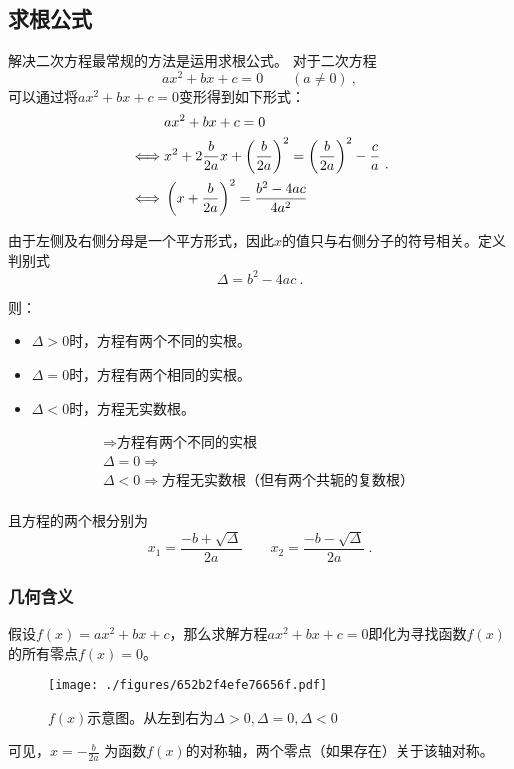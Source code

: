 
\subsection{求根公式}
解决二次方程最常规的方法是运用求根公式。
对于二次方程
$$ax^2+bx+c=0 \qquad (a\neq 0)~,$$
可以通过将$ax^2+bx+c=0$变形得到如下形式：
\begin{equation}
\begin{split}
 & ax^2+bx+c = 0 \\ 
\iff&x^2+2{b\over 2a} x+\left({b\over 2a}\right)^2 = \left({b\over 2a}\right)^2-{c\over a} \\ 
\iff&\left(x+{b\over 2a}\right)^2 = {b^2-4ac\over 4a^2} \\ 
\end{split}~.
\end{equation}

由于左侧及右侧分母是一个平方形式，因此$x$的值只与右侧分子的符号相关。定义判别式
\begin{equation}
\Delta = b^2-4ac~.
\end{equation}

则：
\begin{itemize}
\item $\Delta > 0$时，方程有两个不同的实根。
\item $\Delta = 0$时，方程有两个相同的实根。
\item $\Delta < 0$时，方程无实数根。
\end{itemize}


$$
\begin{aligned}
 \Rightarrow \text{方程有两个不同的实根}\\
\Delta = 0 \Rightarrow \text{}\\
\Delta < 0 \Rightarrow \text{方程无实数根（但有两个共轭的复数根）}\\
\end{aligned}~
$$

且方程的两个根分别为
\begin{equation}
x_1=\frac{-b+\sqrt{\Delta}}{2a}\qquad x_2=\frac{-b-\sqrt{\Delta}}{2a}~.
\end{equation}




\subsubsection{几何含义}
假设$f(x)=ax^2+bx+c$，那么求解方程$ax^2+bx+c=0$即化为寻找函数$f(x)$的所有零点$f(x)=0$。
\begin{figure}[ht]
\centering
\texttt{[image: ./figures/652b2f4efe76656f.pdf]}
\caption{$f(x)$示意图。从左到右为$\Delta > 0, \Delta = 0, \Delta < 0$} \label{fig_quasol_1}
\end{figure}
可见，$x=-\frac{b}{2a}$ 为函数$f(x)$的对称轴，两个零点（如果存在）关于该轴对称。

